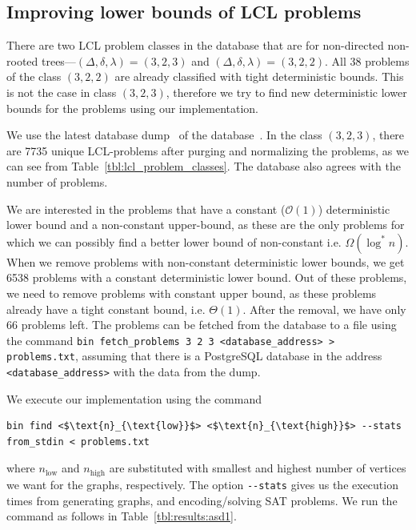 %
%
\subsection{Improving lower bounds of LCL problems}\label{sec:results:improving_bounds}
There are two LCL problem classes in the database that are for non-directed non-rooted trees---$(\Delta, \delta, \lambda) = (3,2,3)$ and $(\Delta, \delta, \lambda) = (3,2,2)$.
All 38 problems of the class $(3,2,2)$ are already classified with tight deterministic bounds.
This is not the case in class $(3,2,3)$, therefore we try to find new deterministic lower bounds for the problems using our implementation.

We use the latest database dump~\cite{DatabaseDump} of the database~\cite{Tereshchenko2021,LclClassifierAalto,LclClassifierGithub}.
In the class $(3,2,3)$, there are 7735 unique LCL-problems after purging and normalizing the problems, as we can see from Table~\ref{tbl:lcl_problem_classes}.
The database also agrees with the number of problems.

We are interested in the problems that have a constant ($\mathcal{O}(1)$) deterministic lower bound and a non-constant upper-bound, as these are the only problems for which we can possibly find a better lower bound of non-constant i.e. $\Omega(\log^*n)$.
When we remove problems with non-constant deterministic lower bounds, we get 6538 problems with a constant deterministic lower bound.
Out of these problems, we need to remove problems with constant upper bound, as these problems already have a tight constant bound, i.e. $\Theta(1)$.
After the removal, we have only 66 problems left.
The problems can be fetched from the database to a file  using the command \verb|bin fetch_problems 3 2 3 <database_address> > problems.txt|, assuming that there is a PostgreSQL database in the address \verb|<database_address>| with the data from the dump.


We execute our implementation using the command
\begin{lstlisting}
bin find <$\text{n}_{\text{low}}$> <$\text{n}_{\text{high}}$> --stats from_stdin < problems.txt
\end{lstlisting}
where $n_\text{low}$ and $n_\text{high}$ are substituted with smallest and highest number of vertices we want for the graphs, respectively.
The option \lstinline{--stats} gives us the execution times from generating graphs, and encoding/solving SAT problems.
We run the command as follows in Table~\ref{tbl:results:asd1}.

